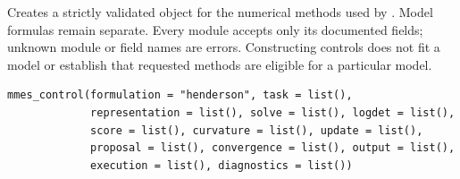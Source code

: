 \documentclass[a4paper]{book}
\begin{document}
\begin{Examples}
\end{Examples}
%
\begin{Description}\relax
Creates a strictly validated  object for the
numerical methods used by . Model formulas remain separate.
Every module accepts only its documented fields; unknown module or field names
are errors. Constructing controls does not fit a model or establish that
requested methods are eligible for a particular model.
\end{Description}
%
\begin{Usage}
\begin{verbatim}
mmes_control(formulation = "henderson", task = list(),
             representation = list(), solve = list(), logdet = list(),
             score = list(), curvature = list(), update = list(),
             proposal = list(), convergence = list(), output = list(),
             execution = list(), diagnostics = list())
\end{verbatim}
\end{Usage}
%
\end{document}
